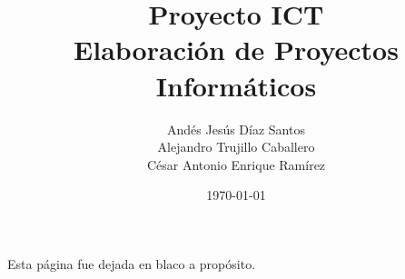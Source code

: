 \documentclass[11pt]{report}
\title{\textbf{Proyecto ICT \\
		Elaboración de Proyectos Informáticos}}
\author{Andés Jesús Díaz Santos\\
	Alejandro Trujillo Caballero\\
	César Antonio Enrique Ramírez}
\date{\today}
\begin{document}
\maketitle
\tableofcontents
\newpage

\thispagestyle{empty}
\null
\vfill
\begin{center}
	Esta página fue dejada en blaco a propósito.
\end{center}
\newpage






\end{document}

